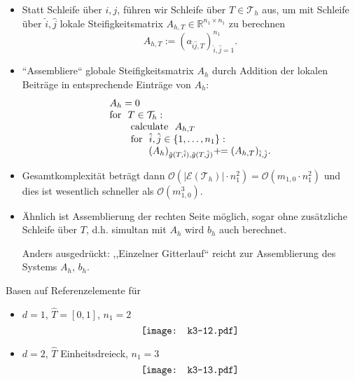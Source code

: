 \documentclass{book}
\newcommand{\assign}{:=}
\newcommand{\plusassign}{+\!\!=}
\newcommand{\tmop}[1]{\ensuremath{\operatorname{#1}}}
\newenvironment{itemizedot}{\begin{itemize} \renewcommand{\labelitemi}{$\bullet$}\renewcommand{\labelitemii}{$\bullet$}\renewcommand{\labelitemiii}{$\bullet$}\renewcommand{\labelitemiv}{$\bullet$}}{\end{itemize}}
\begin{document}
\begin{remark*}
\begin{itemizedot}
    \item Statt Schleife {\"u}ber $i, j$, f{\"u}hren wir Schleife {\"u}ber $T
    \in \mathcal{T}_h$ aus, um mit Schleife {\"u}ber $\hat{i}, \hat{j}$ lokale
    Steifigkeitsmatrix $A_{h, T} \in \mathbb{R}^{n_1 \times n_1}$ zu berechnen
    \[ A_{h, T} \assign (a_{\hat{i} \hat{j}, T})_{\hat{i}, \hat{j} = 1}^{n_1}
       . \]
    \item ``Assembliere`` globale Steifigkeitsmatrix $A_h$ durch Addition der
    lokalen Beitr{\"a}ge in entsprechende Eintr{\"a}ge von $A_h$:
    \[ \begin{array}{l}
         A_h = 0\\
         \tmop{for} \enspace T \in \mathcal{T}_h :\\
         \text{\qquad} \tmop{calculate} \enspace A_{h, T}\\
         \text{\qquad} \tmop{for} \enspace \hat{i}, \hat{j} \in \{ 1, \ldots,
         n_1 \} :\\
         \text{{\hspace{4em}}} (A_h)_{\hat{g} (T, \hat{i}), \hat{g} (T,
         \hat{j})} \plusassign (A_{h, T})_{\hat{i}, \hat{j}} .
       \end{array} \]
    \item Gesamtkomplexit{\"a}t betr{\"a}gt dann $\mathcal{O} (| \mathscr{E}
    (\mathcal{T}_h) | \cdot n_1^2) = \mathcal{O} (m_{1, 0} \cdot n_1^2)$ und
    dies ist wesentlich schneller als $\mathcal{O} (m_{1, 0}^3)$.
    
    \item {\"A}hnlich ist Assemblierung der rechten Seite m{\"o}glich, sogar
    ohne zus{\"a}tzliche Schleife {\"u}ber $T$, d.h. simultan mit $A_h$ wird
    $b_h$ auch berechnet.
    
    Anders ausgedr{\"u}ckt: ,,Einzelner Gitterlauf`` reicht zur Assemblierung
    des Systems $A_h$, $b_h$.
  \end{itemizedot}
\end{remark*}

\begin{example*}
  Basen auf Referenzelemente f{\"u}r
  \begin{itemizedot}
    \item $d = 1$, $\hat{T} = [0, 1]$, $n_1 = 2$
    \[ 
       \raisebox{-0.00258622431454953\height}{\texttt{[image: k3-12.pdf]}}
    \]
    \item $d = 2$, $\hat{T}$ Einheitsdreieck, $n_1 = 3$
    \[ 
       \raisebox{-0.00216522529761275\height}{\texttt{[image: k3-13.pdf]}}
    \]
  \end{itemizedot}
\end{example*}
\end{document}
